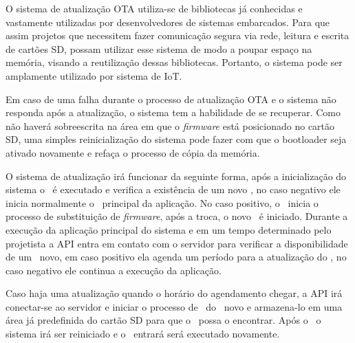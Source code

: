 O sistema de atualização OTA utiliza-se de bibliotecas já conhecidas e vastamente utilizadas por desenvolvedores de sistemas embarcados. Para que assim projetos que necessitem fazer comunicação segura via rede, leitura e escrita de cartões SD, possam utilizar esse sistema de modo a poupar espaço na memória, visando a reutilização dessas bibliotecas. Portanto, o sistema pode ser amplamente utilizado por sistema de IoT. 

Em caso de uma falha durante o processo de atualização OTA e o sistema não responda após a atualização, o sistema tem a habilidade de se recuperar. Como não haverá sobreescrita na área em que o \textit{firmware} está posicionado no cartão SD, uma simples reinicialização do sistema pode fazer com que o bootloader seja ativado novamente e refaça o processo de cópia da memória.

O sistema de atualização irá funcionar da seguinte forma, após a inicialização do sistema o \bootloader\ é executado e verifica a existência de um novo \firmware, no caso negativo ele inicia normalmente o \software\ principal da aplicação. No caso positivo, o \bootloader\ inicia o processo de substituição de \textit{firmware}, após a troca, o novo \software\ é iniciado. Durante a execução da aplicação principal do sistema e em um tempo determinado pelo projetista a API entra em contato com o servidor para verificar a disponibilidade de um \software\ novo, em caso positivo ela agenda um período para a atualização do \firmware, no caso negativo ele continua a execução da aplicação. 

Caso haja uma atualização quando o horário do agendamento chegar, a API irá conectar-se ao servidor e iniciar o processo de \download\ do \firmware\ novo e armazena-lo em uma área já predefinida do cartão SD para que o \bootloader\ possa o encontrar. Após o \download\ o sistema irá ser reiniciado e o \bootloader\ entrará será executado novamente. 





